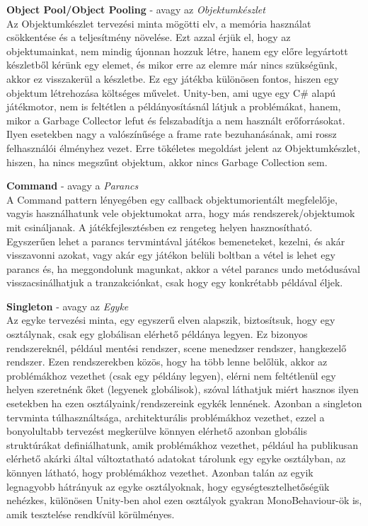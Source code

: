 \textbf{Object Pool/Object Pooling} - avagy az \textit{Objektumkészlet}\\
Az Objektumkészlet tervezési minta mögötti elv, a memória használat csökkentése és a teljesítmény növelése. Ezt azzal érjük el, hogy az objektumainkat, nem mindig újonnan hozzuk létre, hanem  egy előre legyártott készletből kérünk egy elemet, és mikor erre az elemre már nincs szükségünk, akkor ez visszakerül a készletbe. Ez egy játékba különösen fontos, hiszen egy objektum létrehozása költséges művelet. Unity-ben, ami ugye egy C\# alapú játékmotor, nem is feltétlen a példányosításnál látjuk a problémákat, hanem, mikor a Garbage Collector lefut és felszabadítja a nem használt erőforrásokat. Ilyen esetekben nagy a valószínűsége a frame rate bezuhanásának, ami rossz felhasználói élményhez vezet. Erre tökéletes megoldást jelent az Objektumkészlet, hiszen, ha nincs megszűnt objektum, akkor nincs Garbage Collection sem.

\textbf{Command} - avagy a \textit{Parancs}\\
A Command pattern lényegében egy callback objektumorientált megfelelője, vagyis használhatunk vele objektumokat arra, hogy más rendszerek/objektumok mit csináljanak. A játékfejlesztésben ez rengeteg helyen hasznosítható. Egyszerűen lehet a parancs tervmintával játékos bemeneteket, kezelni, és akár visszavonni azokat, vagy akár egy játékon belüli boltban a vétel is lehet egy parancs és, ha meggondolunk magunkat, akkor a vétel parancs undo metódusával visszacsinálhatjuk a tranzakciónkat, csak hogy egy konkrétabb példával éljek.

\textbf{Singleton} - avagy az \textit{Egyke}\\
Az egyke tervezési minta, egy egyszerű elven alapszik, biztosítsuk, hogy egy osztálynak, csak egy globálisan elérhető példánya legyen. Ez bizonyos rendszereknél, például mentési rendszer, scene menedzser rendszer, hangkezelő rendszer. Ezen rendszerekben közös, hogy ha több lenne belőlük, akkor az problémákhoz vezethet (csak egy példány legyen), elérni nem feltétlenül egy helyen szeretnénk őket (legyenek globálisok), szóval láthatjuk miért hasznos ilyen esetekben ha ezen osztályaink/rendszereink egykék lennének. Azonban a singleton tervminta túlhasználtsága, architekturális problémákhoz vezethet, ezzel a bonyolultabb tervezést megkerülve könnyen elérhető azonban globális struktúrákat definiálhatunk, amik problémákhoz vezethet, például ha publikusan elérhető akárki által változtatható adatokat tárolunk egy egyke osztályban, az könnyen látható, hogy problémákhoz vezethet. Azonban talán az egyik legnagyobb hátrányuk az egyke osztályoknak, hogy egységtesztelhetőségük nehézkes, különösen Unity-ben ahol ezen osztályok gyakran MonoBehaviour-ök is, amik tesztelése rendkívül körülményes.

